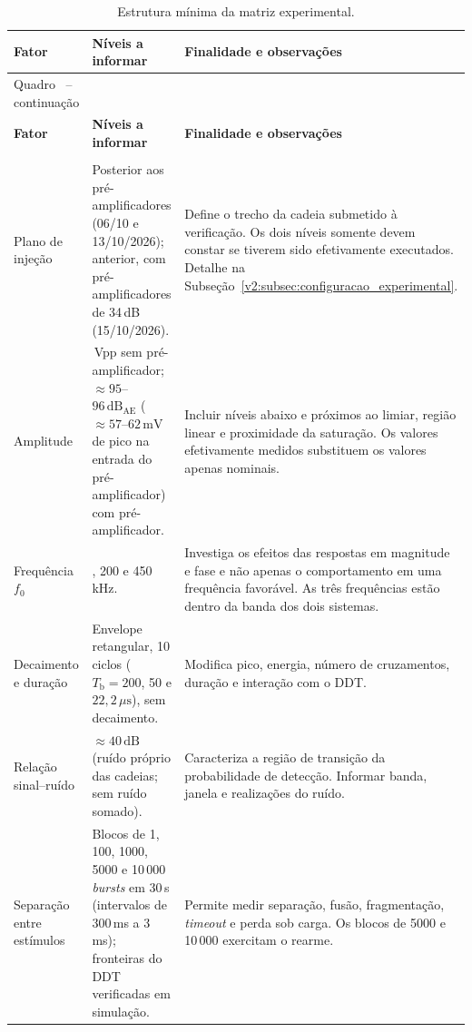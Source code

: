 \begingroup
\renewcommand{\tablename}{Quadro}
\footnotesize
\renewcommand{\arraystretch}{1.22}
\begin{longtable}{|
		>{\raggedright\arraybackslash}p{3.2cm}|
		>{\raggedright\arraybackslash}p{4.6cm}|
		>{\raggedright\arraybackslash}p{6.6cm}|}
	\caption{Estrutura mínima da matriz experimental.}
	\label{v2:qua:matriz_experimental_secao5}\\
	\hline
	\textbf{Fator} & \textbf{Níveis a informar} & \textbf{Finalidade e observações} \\
	\hline
	\endfirsthead
	\multicolumn{3}{c}
	{\tablename\ \thetable{} -- continuação}\\
	\hline
	\textbf{Fator} & \textbf{Níveis a informar} & \textbf{Finalidade e observações} \\
	\hline
	\endhead
	\hline
	\multicolumn{3}{r}{Continua na próxima página.}\\
	\endfoot
	\hline
	\endlastfoot
	Plano de injeção & Posterior aos pré-amplificadores (06/10 e 13/10/2026); anterior, com pré-amplificadores de 34\,dB (15/10/2026). & Define o trecho da cadeia submetido à verificação. Os dois níveis somente devem constar se tiverem sido efetivamente executados. Detalhe na Subseção~\ref{v2:subsec:configuracao_experimental}. \\
	\hline
	Amplitude & 1\,Vpp sem pré-amplificador; \(\approx 95\)--\(96\,\mathrm{dB}_{\mathrm{AE}}\) (\(\approx 57\)--\(62\,\mathrm{mV}\) de pico na entrada do pré-amplificador) com pré-amplificador. & Incluir níveis abaixo e próximos ao limiar, região linear e proximidade da saturação. Os valores efetivamente medidos substituem os valores apenas nominais. \\
	\hline
	Frequência \(f_0\) & 50, 200 e 450\,kHz. & Investiga os efeitos das respostas em magnitude e fase e não apenas o comportamento em uma frequência favorável. As três frequências estão dentro da banda dos dois sistemas. \\
	\hline
	Decaimento e duração & Envelope retangular, 10 ciclos (\(T_{\mathrm{b}} = 200\), 50 e \(22{,}2\,\mu\mathrm{s}\)), sem decaimento. & Modifica pico, energia, número de cruzamentos, duração e interação com o DDT. \\
	\hline
	Relação sinal--ruído & \(\approx 40\,\mathrm{dB}\) (ruído próprio das cadeias; sem ruído somado). & Caracteriza a região de transição da probabilidade de detecção. Informar banda, janela e realizações do ruído. \\
	\hline
	Separação entre estímulos & Blocos de 1, 100, 1000, 5000 e 10\,000 \textit{bursts} em 30\,s (intervalos de 300\,ms a 3\,ms); fronteiras do DDT verificadas em simulação. & Permite medir separação, fusão, fragmentação, \textit{timeout} e perda sob carga. Os blocos de 5000 e 10\,000 exercitam o rearme. \\

\end{longtable}
